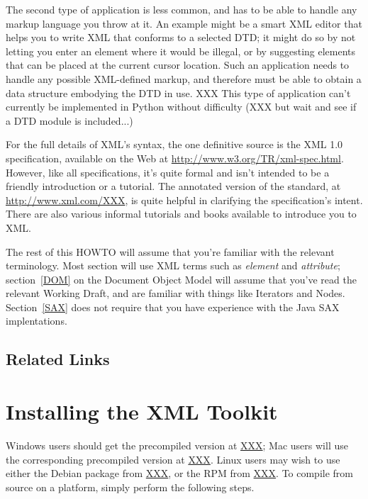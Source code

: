 \documentclass{howto}
\begin{document}
The second type of application is less common, and has to be able to
handle any markup language you throw at it.  An example might be a
smart XML editor that helps you to write XML that conforms to a
selected DTD; it might do so by not letting you enter an element where
it would be illegal, or by suggesting elements that can be placed at
the current cursor location.  Such an application needs to handle any
possible XML-defined markup, and therefore must be able to obtain a
data structure embodying the DTD in use.  XXX This type of application
can't currently be implemented in Python without difficulty (XXX but
wait and see if a DTD module is included...)

For the full details of XML's syntax, the one definitive source is the
XML 1.0 specification, available on the Web at
\url{http://www.w3.org/TR/xml-spec.html}.  However, like all
specifications, it's quite formal and isn't intended to be a friendly
introduction or a tutorial.  The annotated version of the standard, at
\url{http://www.xml.com/XXX}, is quite helpful in clarifying the
specification's intent.  There are also various informal tutorials and
books available to introduce you to XML.

The rest of this HOWTO will assume that you're familiar with the
relevant terminology.  Most section will use XML terms such as
\emph{element} and \emph{attribute}; section~\ref{DOM} on the Document
Object Model will assume that you've read the relevant Working Draft,
and are familiar with things like Iterators and Nodes.
Section~\ref{SAX} does not require that you have experience with the
Java SAX implentations.

\subsection{Related Links}

\section{Installing the XML Toolkit}

Windows users should get the precompiled version at \url{XXX}; Mac
users will use the corresponding precompiled version at \url{XXX}.
Linux users may wish to use either the Debian package from \url{XXX},
or the RPM from \url{XXX}.  To compile from source on a \UNIX{} platform,
simply perform the following steps.
\end{document}
